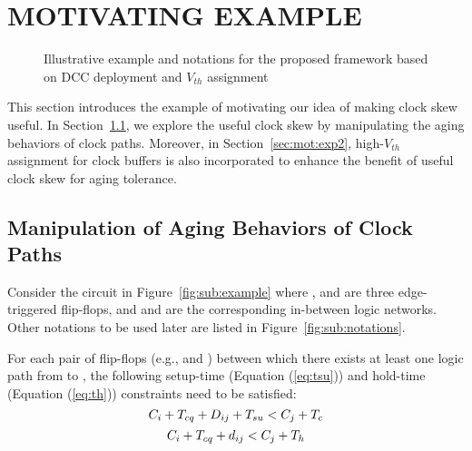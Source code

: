 \section{MOTIVATING EXAMPLE}
\label{sec:motivate}
\begin{figure*}[!ht]
    \centering
    \hspace{0.0cm}
    \caption{Illustrative example and notations for the proposed framework based on DCC deployment and $V_{th}$ assignment}
    \label{fig:en}
\end{figure*}


This section introduces the example of motivating our idea of making clock skew useful. In Section~\ref{sec:mot:exp1}, we explore the useful clock skew by manipulating the aging behaviors of clock paths. Moreover, in Section~\ref{sec:mot:exp2}, high-$V_{th}$ assignment for clock buffers is also incorporated to enhance the benefit of useful clock skew for aging tolerance. 

\subsection{Manipulation of Aging Behaviors of Clock Paths}
\label{sec:mot:exp1}
Consider the circuit in Figure~\ref{fig:sub:example} where ,  and  are three edge-triggered flip-flops, and  and  are the corresponding in-between logic networks. Other notations to be used later are listed in Figure~\ref{fig:sub:notations}.

For each pair of flip-flops (e.g.,  and ) between which there exists at least one logic path from  to , the following setup-time (Equation (\ref{eq:tsu})) and hold-time (Equation (\ref{eq:th})) constraints need to be satisfied:
\begin{equation}
	\fontsize{9}{9.6} C_i+T_{cq}+D_{ij}+T_{su}<C_j+T_c
	\label{eq:tsu}
\end{equation}
\begin{equation}
	\fontsize{9}{9.6} C_i+T_{cq}+d_{ij}<C_j+T_h
	\label{eq:th}
\end{equation}

